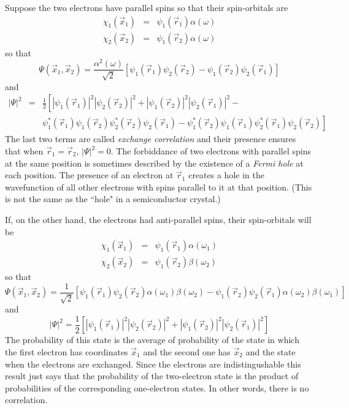 Suppose the two electrons have parallel spins so that their spin-orbitals are
\begin{eqnarray}
\chi_1(\vec{x}_1) &=& \psi_1(\vec{r}_1)\alpha(\omega) \label{c2e43} \\
\chi_2(\vec{x}_2) &=& \psi_1(\vec{r}_2)\alpha(\omega) \label{c2e44}
\end{eqnarray}
so that
\[
\Psi(\vec{x}_1, \vec{x}_2) = \frac{\alpha^2(\omega)}{\sqrt{2}}[\psi_1(\vec{r}_1)
\psi_2(\vec{r}_2) - \psi_1(\vec{r}_2)\psi_2(\vec{r}_1)]
\]
and
\begin{eqnarray*}
|\Psi|^2 &=& \frac{1}{2}\left[|\psi_1(\vec{r}_1)|^2|\psi_2(\vec{r}_2)|^2 + 
|\psi_1(\vec{r}_2)|^2|\psi_2(\vec{r}_1)|^2 - \right. \\ 
 & & \left. 
 \psi_1^\ast(\vec{r}_1)\psi_1(\vec{r}_2)\psi_2^\ast(\vec{r}_2)\psi_2(\vec{r}_1)-
\psi_1^\ast(\vec{r}_2)\psi_1(\vec{r}_1)\psi_2^\ast(\vec{r}_1)\psi_2(\vec{r}_2)
\right]
\end{eqnarray*}
The last two terms are called \emph{exchange correlation} and their presence
ensures that when $\vec{r}_1 = \vec{r}_2$, $|\Psi|^2 = 0$. The forbiddance of
two electrons with parallel spins at the same position is sometimes described
by the existence of a \emph{Fermi hole} at each position. The presence of an
electron at $\vec{r}_1$ creates a hole in the wavefunction of all other 
electrons with spins parallel to it at that position. (This is not the same as
the ``hole" in a semiconductor crystal.)

If, on the other hand, the electrons had anti-parallel spins, their spin-orbitals
will be
\begin{eqnarray}
\chi_1(\vec{x}_1) &=& \psi_1(\vec{r}_1)\alpha(\omega_1) \label{c2e45} \\
\chi_2(\vec{x}_2) &=& \psi_1(\vec{r}_2)\beta(\omega_2) \label{c2e46}
\end{eqnarray}
so that
\[
\Psi(\vec{x}_1, \vec{x}_2) = \frac{1}{\sqrt{2}}
[\psi_1(\vec{r}_1) \psi_2(\vec{r}_2)\alpha(\omega_1)\beta(\omega_2) - 
\psi_1(\vec{r}_2)\psi_2(\vec{r}_1)\alpha(\omega_2)\beta(\omega_1)]
\]
and
\[
|\Psi|^2 = \frac{1}{2}\left[|\psi_1(\vec{r}_1)|^2|\psi_2(\vec{r}_2)|^2 + 
|\psi_1(\vec{r}_2)|^2|\psi_2(\vec{r}_1)|^2\right]
\]
The probability of this state is the average of probability of the state in
which the first electron has coordinates $\vec{x}_1$ and the second one has
$\vec{x}_2$ and the state when the electrons are exchanged. Since the electrons
are indistingushable this result just says that the probability of the 
two-electron state is the product of probabilities of the corresponding 
one-electron states. In other words, there is no correlation.

